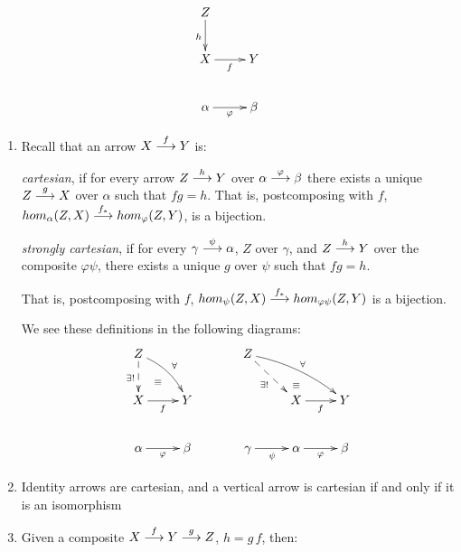 $$
\xymatrix
      {
       Z \ar[d]_h 
       & 
       \\
	   X \ar[r]_f 
	   & Y  
	   \\
		\alpha \ar[r]_\varphi & \beta
	  }
$$     
\begin{sinnadastandard} \label{basicdefinitions}

\begin{enumerate} $ $

\item Recall that an arrow $X \overset {f} {\longrightarrow} Y$ is:

\emph{cartesian}, if for every 
arrow $Z \overset {h} {\longrightarrow} Y$ over $\alpha \overset {\varphi} {\longrightarrow} \beta$ there exists a unique $Z \overset {g} {\longrightarrow} X$ over $\alpha$ such that $fg = h$.
That is, postcomposing with $f$,  
${hom_{\alpha}(Z, X) \overset {f_*} {\longrightarrow} hom_{\varphi}(Z,Y)}$, is a bijection.

\vspace{1ex}

\emph{strongly cartesian}, if for every 
$\gamma \overset {\psi} {\longrightarrow} \alpha$, $Z$ over $\gamma$, and 
$Z \overset {h} {\longrightarrow} Y$ over the composite $\varphi \psi$, there exists a unique $g$ over $\psi$ such that $fg = h$. 

   That is, postcomposing with $f$,  
${hom_{\psi}(Z, X) \overset {f_*} {\longrightarrow} hom_{\varphi \psi}(Z,Y)}$ is a bijection.


We see these definitions in  the following diagrams:   
$$
\xymatrix
    {
     Z \ar@/^/[dr]^{\forall} 
       \ar@{-->}[d]_{\exists!} 
   & {}
   \\
     X \ar@{}[ur]|(.4){\equiv} 
       \ar[r]_f  
   & Y  
   \\
     \alpha \ar[r]_\varphi 
   & \beta}
\hspace{8ex}
\xymatrix
    { 
     Z \ar@/^/[rrd]^\forall 
       \ar@{-->}[rd]_{\exists !}
   && {}
   \\
    & X \ar@{}[u]|(.33){\equiv} 
        \ar[r]_f  
    & Y  
    \\
	  \gamma \ar[r]_\psi 
	& \alpha \ar[r]_\varphi 
	& \beta}
$$

\item \label{cartesianiffiso}
Identity arrows are cartesian, and a vertical arrow is cartesian if and only if it is an isomorphism

\item  \label{cartesiancomposing} 
Given a composite $X \overset {f} {\longrightarrow} Y \overset {g} {\longrightarrow} Z$, $h = g\, f$, then:


\end{enumerate}
\end{sinnadastandard}
